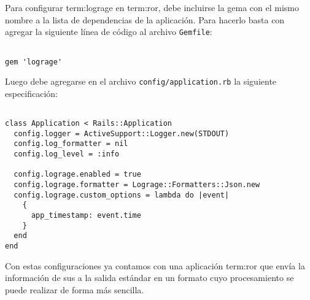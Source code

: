 Para configurar \gls{term:lograge} en \gls{term:ror}, debe incluirse la gema con
el mismo nombre a la lista de dependencias de la aplicación. Para hacerlo basta
con agregar la siguiente línea de código al archivo \texttt{Gemfile}:

\begin{lstlisting}

gem 'lograge'

\end{lstlisting}

Luego debe agregarse en el archivo \texttt{config/application.rb} la siguiente
especificación:

\begin{lstlisting}

class Application < Rails::Application
  config.logger = ActiveSupport::Logger.new(STDOUT)
  config.log_formatter = nil
  config.log_level = :info

  config.lograge.enabled = true
  config.lograge.formatter = Lograge::Formatters::Json.new
  config.lograge.custom_options = lambda do |event|
    {
      app_timestamp: event.time
    }
  end
end

\end{lstlisting}

Con estas configuraciones ya contamos con una aplicación \gls{term:ror} que
envía la información de sus  a la salida estándar en un formato cuyo
procesamiento se puede realizar de forma más sencilla.
